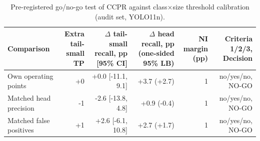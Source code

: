 \begin{table}[!htbp]
\fontsize{5pt}{6pt}\selectfont
\caption{Pre-registered go/no-go test of CCPR against class$\times$size threshold calibration (audit set, YOLO11n).}
\label{tab:ccpr}
\begin{tabular*}{\textwidth}{@{\extracolsep{\fill}}lrrrrr}
\toprule
Comparison & \shortstack{Extra tail-\\small TP} & \shortstack{$\Delta$ tail-small\\recall, pp [95\% CI]} & \shortstack{$\Delta$ head recall, pp\\(one-sided 95\% LB)} & \shortstack{NI margin\\(pp)} & \shortstack{Criteria 1/2/3,\\Decision} \\
\midrule
Own operating points & +0 & +0.0 [-11.1, 9.1] & +3.7 (+2.7) & 1 & no/yes/no, NO-GO \\
Matched head precision & -1 & -2.6 [-13.8, 4.8] & +0.9 (-0.4) & 1 & no/yes/no, NO-GO \\
Matched false positives & +1 & +2.6 [-6.1, 10.8] & +2.7 (+1.7) & 1 & no/yes/no, NO-GO \\
\bottomrule
\end{tabular*}
\end{table}
